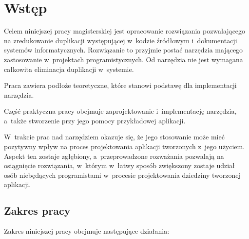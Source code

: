 \chapter{Wstęp} \label{chap:intro}

Celem niniejszej pracy magisterskiej jest opracowanie rozwiązania pozwalającego na zredukowanie duplikacji występującej w~kodzie źródłowym i~dokumentacji systemów informatycznych.
Rozwiązanie to przyjmie postać narzędzia mającego zastosowanie w~projektach programistycznych.
Od narzędzia nie jest wymagana całkowita eliminacja duplikacji w~systemie.

Praca zawiera podłoże teoretyczne, które stanowi podstawę dla implementacji narzędzia.

Część praktyczna pracy obejmuje zaprojektowanie i~implementację narzędzia, a~także stworzenie przy jego pomocy przykładowej aplikacji.

W~trakcie prac nad narzędziem okazuje się, że jego stosowanie może mieć pozytywny wpływ na proces projektowania aplikacji tworzonych z~jego użyciem.
Aspekt ten zostaje zgłębiony, a~przeprowadzone rozważania pozwalają na osiągnięcie rozwiązania, w~którym w~łatwy sposób zwiększony zostaje udział osób niebędących programistami w~procesie projektowania dziedziny tworzonej aplikacji.



\section{Zakres pracy}

Zakres niniejszej pracy obejmuje następujące działania:

